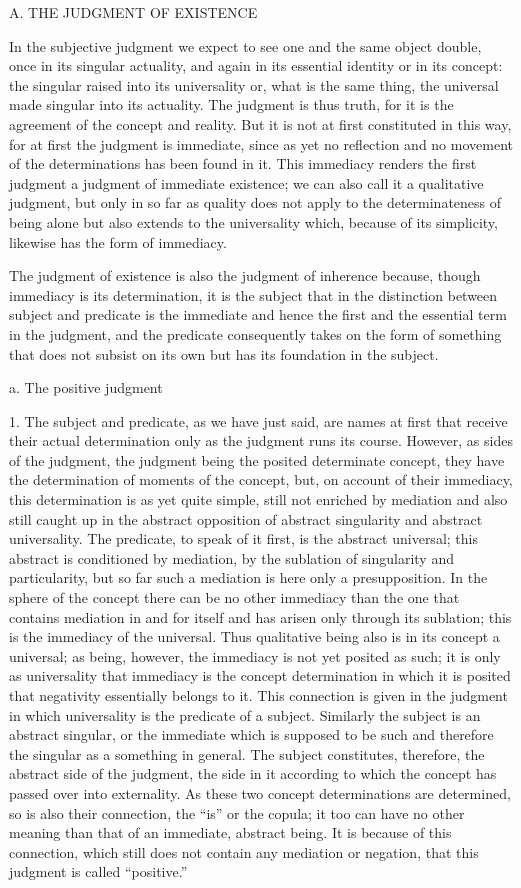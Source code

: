 
A. THE JUDGMENT OF EXISTENCE

In the subjective judgment we expect to see
one and the same object double,
once in its singular actuality,
and again in its essential identity
or in its concept:
the singular raised into its universality
or, what is the same thing,
the universal made singular into its actuality.
The judgment is thus truth,
for it is the agreement of the concept and reality.
But it is not at first constituted in this way,
for at first the judgment is immediate,
since as yet no reflection and no movement
of the determinations has been found in it.
This immediacy renders the first judgment
a judgment of immediate existence;
we can also call it a qualitative judgment,
but only in so far as quality does not apply
to the determinateness of being alone
but also extends to the universality
which, because of its simplicity,
likewise has the form of immediacy.

The judgment of existence is also
the judgment of inherence because,
though immediacy is its determination,
it is the subject that in the distinction
between subject and predicate is the immediate
and hence the first and the essential
term in the judgment,
and the predicate consequently takes on
the form of something that does not subsist on its own
but has its foundation in the subject.

a. The positive judgment

1. The subject and predicate, as we have just said,
are names at first that receive their actual determination
only as the judgment runs its course.
However, as sides of the judgment,
the judgment being the posited determinate concept,
they have the determination of moments of the concept,
but, on account of their immediacy,
this determination is as yet quite simple,
still not enriched by mediation
and also still caught up in
the abstract opposition of
abstract singularity
and abstract universality.
The predicate, to speak of it first,
is the abstract universal;
this abstract is conditioned by mediation,
by the sublation of singularity and particularity,
but so far such a mediation is here only a presupposition.
In the sphere of the concept
there can be no other immediacy
than the one that contains
mediation in and for itself
and has arisen only through its sublation;
this is the immediacy of the universal.
Thus qualitative being also is
in its concept a universal;
as being, however, the immediacy is
not yet posited as such;
it is only as universality
that immediacy is the concept determination
in which it is posited that
negativity essentially belongs to it.
This connection is given in the judgment
in which universality is the predicate of a subject.
Similarly the subject is an abstract singular,
or the immediate which is supposed to be such
and therefore the singular as a something in general.
The subject constitutes, therefore,
the abstract side of the judgment,
the side in it according to which
the concept has passed over into externality.
As these two concept determinations are determined,
so is also their connection,
the “is” or the copula;
it too can have no other meaning than
that of an immediate, abstract being.
It is because of this connection,
which still does not contain any mediation or negation,
that this judgment is called “positive.”

